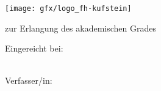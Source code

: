 \thispagestyle{empty}
\begin{titlepage}

  \condTWOSIDE{\changetext{}{19mm}{}{19mm}{}}

  \vspace{1cm}
  \begin{center}
    \hfill\texttt{[image: gfx/logo\_fh-kufstein]} \\ 
  \end{center}
  \vfill

  \begin{center}
    \LARGE \textbf{\myTitle}
  \end{center} 
  \vfill

  \begin{center}
  \end{center}
  \vfill

  \begin{center}
    \Large{zur Erlangung des akademischen Grades}
  \end{center}
  \vfill

  \begin{center}
    \LARGE \textbf{\myDegree}
  \end{center}
  \vfill

  \begin{center}
    \large Eingereicht bei:\\ 
    \vspace{0.1cm}
    \large \textbf{\myUni}\\
    \vspace{0.1cm}
    \large \textbf{\myFaculty}
  \end{center}
  \vfill

  \begin{center}
    \large Verfasser/in:\\
    \vspace{0.1cm}
    \large \textbf{\myName}\\
    \vspace{0.1cm}
    \large \textbf{\myId}\\
  \end{center}
  \vfill


\end{titlepage}
